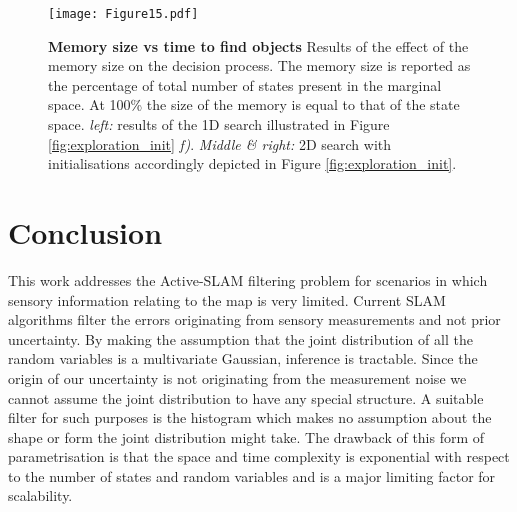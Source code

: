 \documentclass[review]{elsarticle}
\numberwithin{equation}{section}
\begin{document}
\begin{figure}
  \texttt{[image: Figure15.pdf]}
  \caption{\textbf{Memory size vs time to find objects} Results of the effect of the memory size on the decision process.
  The memory size is reported as the percentage of total number of states present in the marginal space. At 100\% the size
  of the memory is equal to that of the state space. \textit{left:} results of the 1D search illustrated in Figure \ref{fig:exploration_init} \textit{f)}.
  \textit{Middle \& right:} 2D search with initialisations accordingly depicted in Figure \ref{fig:exploration_init}.
  }
  \label{fig:time_to_reach_goal}
\end{figure}

\FloatBarrier
\section{Conclusion}

This work addresses the Active-SLAM filtering problem for scenarios in which sensory information relating to the map is very limited. Current
SLAM algorithms filter the errors originating from sensory measurements and not prior uncertainty. By making the assumption
that the joint distribution of all the random variables is a multivariate Gaussian, inference is tractable. Since the origin of 
our uncertainty is not originating from the measurement noise we cannot assume the joint distribution to have any special structure. 
A suitable filter for such purposes is the histogram which makes no assumption about the shape or form the joint distribution might take. 
The drawback of this form of parametrisation is that the space and time complexity is exponential with respect to the number of states and random variables 
and is a major limiting factor for scalability. 
\end{document}
